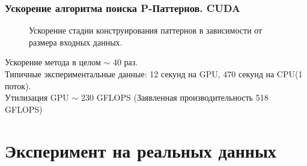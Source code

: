 \documentclass[smaller]{beamer}
\begin{document}
\begin{frame}
  \frametitle{Ускорение алгоритма поиска P-Паттернов. CUDA}
\begin{figure}[H]
	\caption{Ускорение стадии конструирования паттернов в зависимости от размера входных данных.}
\end{figure}

Ускорение метода в целом $\sim$ 40 раз. \\
Типичные экспериментальные данные: 12 секунд на GPU, 470 секунд на CPU(1 поток).\\
Утилизация GPU $\sim$ 230 GFLOPS (Заявленная производительность 518 GFLOPS)

\end{frame}


\section{Эксперимент на реальных данных}
\end{document}
